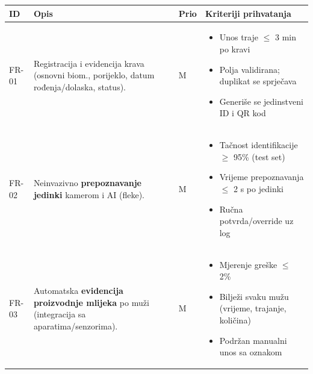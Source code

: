 \documentclass{article}
\begin{document}
\renewcommand{\arraystretch}{1.25}
\setlength{\tabcolsep}{5pt}
\begin{longtable}{|L{1.6cm}|L{8.0cm}|C{0.9cm}|L{6.2cm}|}
\hline
{}\textbf{ID} & \textbf{Opis} & \textbf{Prio} & \textbf{Kriteriji prihvatanja} \\
\hline
FR-01 & Registracija i evidencija krava (osnovni biom., porijeklo, datum rođenja/dolaska, status). & M &
\begin{minipage}[t]{6.2cm}\vspace{2pt}
\begin{itemize}\setlength\itemsep{2pt}\setlength\parskip{0pt}\setlength\parsep{0pt}
    \item Unos traje $\leq$ 3 min po kravi
    \item Polja validirana; duplikat se sprječava
    \item Generiše se jedinstveni ID i QR kod
\end{itemize}\vspace{2pt}
\end{minipage} \\
\hline
FR-02 & Neinvazivno \textbf{prepoznavanje jedinki} kamerom i AI (fleke). & M &
\begin{minipage}[t]{6.2cm}\vspace{2pt}
\begin{itemize}\setlength\itemsep{2pt}\setlength\parskip{0pt}\setlength\parsep{0pt}
    \item Tačnost identifikacije $\geq$ 95\% (test set)
    \item Vrijeme prepoznavanja $\leq$ 2 s po jedinki
    \item Ručna potvrda/override uz log
\end{itemize}\vspace{2pt}
\end{minipage} \\
\hline
FR-03 & Automatska \textbf{evidencija proizvodnje mlijeka} po muži (integracija sa aparatima/senzorima). & M &
\begin{minipage}[t]{6.2cm}\vspace{2pt}
\begin{itemize}\setlength\itemsep{2pt}
    \item Mjerenje greške $\leq$ 2\%
    \item Bilježi svaku mužu (vrijeme, trajanje, količina)
    \item Podržan manualni unos sa oznakom
\end{itemize}\vspace{2pt}

\end{minipage}
\end{longtable}
\end{document}
